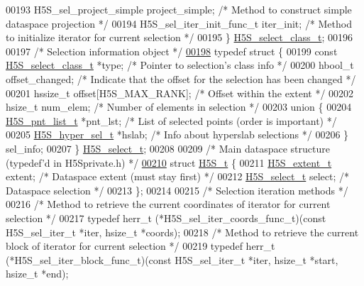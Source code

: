 \begin{DoxyCode}
00193     H5S\_sel\_project\_simple project\_simple;      \textcolor{comment}{/* Method to construct simple dataspace projection */}
00194     H5S\_sel\_iter\_init\_func\_t iter\_init;         \textcolor{comment}{/* Method to initialize iterator for current selection */}
00195 \} \hyperlink{struct_h5_s__select__class__t}{H5S\_select\_class\_t};
00196 
00197 \textcolor{comment}{/* Selection information object */}
\hyperlink{struct_h5_s__select__t}{00198} \textcolor{keyword}{typedef} \textcolor{keyword}{struct }\{
00199     \textcolor{keyword}{const} \hyperlink{struct_h5_s__select__class__t}{H5S\_select\_class\_t} *type;     \textcolor{comment}{/* Pointer to selection's class info */}
00200     hbool\_t offset\_changed;             \textcolor{comment}{/* Indicate that the offset for the selection has been changed */}
00201     hssize\_t offset[H5S\_MAX\_RANK];      \textcolor{comment}{/* Offset within the extent */}
00202     hsize\_t num\_elem;   \textcolor{comment}{/* Number of elements in selection */}
00203     \textcolor{keyword}{union }\{
00204         \hyperlink{struct_h5_s__pnt__list__t}{H5S\_pnt\_list\_t} *pnt\_lst; \textcolor{comment}{/* List of selected points (order is important) */}
00205         \hyperlink{struct_h5_s__hyper__sel__t}{H5S\_hyper\_sel\_t} *hslab;  \textcolor{comment}{/* Info about hyperslab selections */}
00206     \} sel\_info;
00207 \} \hyperlink{struct_h5_s__select__t}{H5S\_select\_t};
00208 
00209 \textcolor{comment}{/* Main dataspace structure (typedef'd in H5Sprivate.h) */}
\hyperlink{struct_h5_s__t}{00210} \textcolor{keyword}{struct }\hyperlink{struct_h5_s__t}{H5S\_t} \{
00211     \hyperlink{struct_h5_s__extent__t}{H5S\_extent\_t} extent;                \textcolor{comment}{/* Dataspace extent (must stay first) */}
00212     \hyperlink{struct_h5_s__select__t}{H5S\_select\_t} select;        \textcolor{comment}{/* Dataspace selection */}
00213 \};
00214 
00215 \textcolor{comment}{/* Selection iteration methods */}
00216 \textcolor{comment}{/* Method to retrieve the current coordinates of iterator for current selection */}
00217 \textcolor{keyword}{typedef} herr\_t (*H5S\_sel\_iter\_coords\_func\_t)(\textcolor{keyword}{const} H5S\_sel\_iter\_t *iter, hsize\_t *coords);
00218 \textcolor{comment}{/* Method to retrieve the current block of iterator for current selection */}
00219 \textcolor{keyword}{typedef} herr\_t (*H5S\_sel\_iter\_block\_func\_t)(\textcolor{keyword}{const} H5S\_sel\_iter\_t *iter, hsize\_t *start, hsize\_t *end);

\end{DoxyCode}
